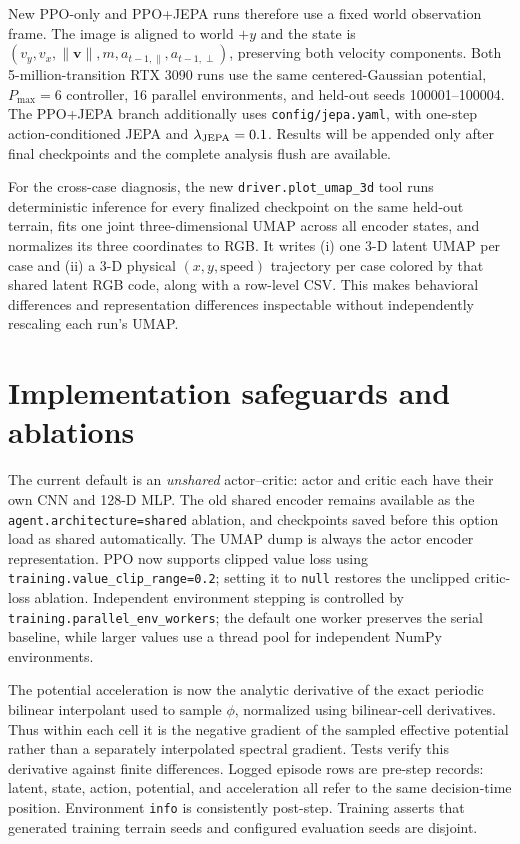 \documentclass[10pt]{article}
\newcommand{\code}[1]{\texttt{#1}}
\begin{document}
New PPO-only and PPO+JEPA runs therefore use a fixed world observation frame.
The image is aligned to world $+y$ and the state is
$(v_y,v_x,\|\mathbf v\|,m,a_{t-1,\parallel},a_{t-1,\perp})$, preserving both
velocity components. Both 5-million-transition RTX 3090 runs use the same
centered-Gaussian potential, $P_{\max}=6$ controller, 16 parallel
environments, and held-out seeds 100001--100004. The PPO+JEPA branch additionally
uses \code{config/jepa.yaml}, with one-step action-conditioned JEPA and
$\lambda_{\rm JEPA}=0.1$. Results will be appended only after final checkpoints
and the complete analysis flush are available.

For the cross-case diagnosis, the new
\code{driver.plot\_umap\_3d} tool runs deterministic inference for every
finalized checkpoint on the same held-out terrain, fits one joint three-dimensional
UMAP across all encoder states, and normalizes its three coordinates to RGB.
It writes (i) one 3-D latent UMAP per case and (ii) a 3-D physical
$(x,y,\text{speed})$ trajectory per case colored by that shared latent RGB code,
along with a row-level CSV. This makes behavioral differences and representation
differences inspectable without independently rescaling each run's UMAP.

\section{Implementation safeguards and ablations}
The current default is an \emph{unshared} actor--critic: actor and critic each
have their own CNN and 128-D MLP. The old shared encoder remains available as
the \code{agent.architecture=shared} ablation, and checkpoints saved before this
option load as shared automatically. The UMAP dump is always the actor encoder
representation. PPO now supports clipped value loss using
\code{training.value\_clip\_range=0.2}; setting it to \code{null} restores the
unclipped critic-loss ablation. Independent environment stepping is controlled
by \code{training.parallel\_env\_workers}; the default one worker preserves the
serial baseline, while larger values use a thread pool for independent NumPy
environments.

The potential acceleration is now the analytic derivative of the exact periodic
bilinear interpolant used to sample $\phi$, normalized using bilinear-cell
derivatives. Thus within each cell it is the negative gradient of the sampled
effective potential rather than a separately interpolated spectral gradient.
Tests verify this derivative against finite differences. Logged episode rows are
pre-step records: latent, state, action, potential, and acceleration all refer
to the same decision-time position. Environment \code{info} is consistently
post-step. Training asserts that generated training terrain seeds and configured
evaluation seeds are disjoint.
\end{document}
